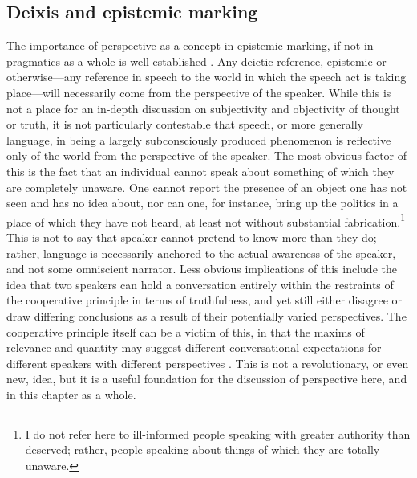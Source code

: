 \subsection{Deixis and epistemic marking}
The importance of perspective as a concept in epistemic marking, if not in pragmatics as a whole is well-established \cite{Evans2005View}. Any deictic reference, epistemic or otherwise---any reference in speech to the world in which the speech act is taking place---will necessarily come from the perspective of the speaker. While this is not a place for an in-depth discussion on subjectivity and objectivity of thought or truth, it is not particularly contestable that speech, or more generally language, in being a largely subconsciously produced phenomenon is reflective only of the world from the perspective of the speaker. The most obvious factor of this is the fact that an individual cannot speak about something of which they are completely unaware. One cannot report the presence of an object one has not seen and has no idea about, nor can one, for instance, bring up the politics in a place of which they have not heard, at least not without substantial fabrication.\footnote{I do not refer here to ill-informed people speaking with greater authority than deserved; rather, people speaking about things of which they are totally unaware.} This is not to say that speaker cannot pretend to know more than they do; rather, language is necessarily anchored to the actual awareness of the speaker, and not some omniscient narrator. Less obvious implications of this include the idea that two speakers can hold a conversation entirely within the restraints of the cooperative principle in terms of truthfulness, and yet still either disagree or draw differing conclusions as a result of their potentially varied perspectives. The cooperative principle itself can be a victim of this, in that the maxims of relevance and quantity may suggest different conversational expectations for different speakers with different perspectives \cite{BodnarukForthcoming}. This is not a revolutionary, or even new, idea, but it is a useful foundation for the discussion of perspective here, and in this chapter as a whole.


